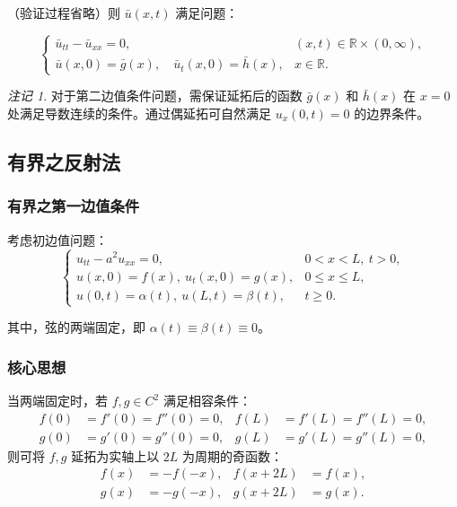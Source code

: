 \documentclass[12pt,a4paper]{article}
\numberwithin{subsection}{section}   %
\numberwithin{subsubsection}{subsection}
\theoremstyle{plain}
\theoremstyle{definition}
\theoremstyle{remark}
\newtheorem{remark}[theorem]{注记}
\theoremstyle{remark}
\begin{document}
		（验证过程省略）则 \(\bar{u}(x, t)\) 满足问题：
		
		\begin{equation}
			\begin{cases}
				\bar{u}_{tt} - \bar{u}_{xx} = 0, & (x, t) \in \mathbb{R} \times (0, \infty), \\
				\bar{u}(x, 0) = \bar{g}(x), \quad \bar{u}_t(x, 0) = \bar{h}(x), & x \in \mathbb{R}.
			\end{cases}
		\end{equation}
		
		\begin{remark}
			对于第二边值条件问题，需保证延拓后的函数 \(\bar{g}(x)\) 和 \(\bar{h}(x)\) 在 \(x=0\) 处满足导数连续的条件。通过偶延拓可自然满足 \(u_x(0,t) = 0\) 的边界条件。
		\end{remark}
	
	
\subsection{有界之反射法}

\subsubsection{有界之第一边值条件}
考虑初边值问题：
\begin{equation}
	\begin{cases}
		u_{tt} - a^2 u_{xx} = 0, & 0 < x < L, \ t > 0, \\
		u(x, 0) = f(x), \ u_t(x, 0) = g(x), & 0 \leq x \leq L, \\
		u(0, t) = \alpha(t), \ u(L, t) = \beta(t), & t \geq 0.
	\end{cases}
\end{equation}

其中，弦的两端固定，即 \(\alpha(t) \equiv \beta(t) \equiv 0\)。

\subsubsection{核心思想}
当两端固定时，若 \(f, g \in C^2\) 满足相容条件：
\begin{equation}
	\begin{aligned}
		f(0) &= f'(0) = f''(0) = 0, & f(L) &= f'(L) = f''(L) = 0, \\
		g(0) &= g'(0) = g''(0) = 0, & g(L) &= g'(L) = g''(L) = 0,
	\end{aligned}
\end{equation}
则可将 \(f, g\) 延拓为实轴上以 \(2L\) 为周期的奇函数：
\begin{equation}
	\begin{aligned}
		f(x) &= -f(-x), & f(x + 2L) &= f(x), \\
		g(x) &= -g(-x), & g(x + 2L) &= g(x).
	\end{aligned}
\end{equation}
\end{document}
